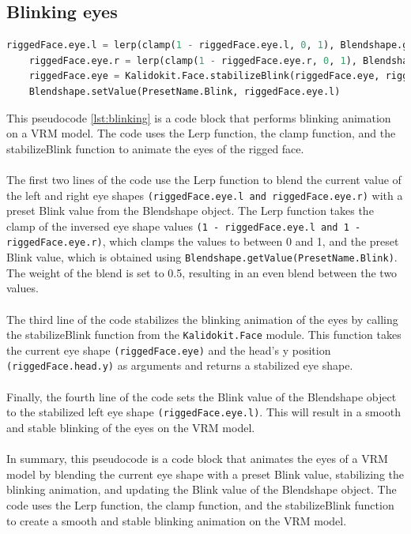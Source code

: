 \subsection{Blinking eyes}
\begin{lstlisting}[language=Python,caption=Blinking of the eyes,label=lst:blinking]
    riggedFace.eye.l = lerp(clamp(1 - riggedFace.eye.l, 0, 1), Blendshape.getValue(PresetName.Blink), 0.5)
    riggedFace.eye.r = lerp(clamp(1 - riggedFace.eye.r, 0, 1), Blendshape.getValue(PresetName.Blink), 0.5)
    riggedFace.eye = Kalidokit.Face.stabilizeBlink(riggedFace.eye, riggedFace.head.y)
    Blendshape.setValue(PresetName.Blink, riggedFace.eye.l)

\end{lstlisting}
This pseudocode \ref{lst:blinking} is a code block that performs blinking animation on a VRM model. 
The code uses the Lerp function, the clamp function, and the stabilizeBlink function 
to animate the eyes of the rigged face.
\\
\\
The first two lines of the code use the Lerp function to blend the current value of the left and right eye shapes 
\texttt{(riggedFace.eye.l and riggedFace.eye.r)} with a preset Blink value from the Blendshape object. The Lerp 
function takes the clamp of the inversed eye shape values \texttt{(1 - riggedFace.eye.l and 1 - riggedFace.eye.r)}, 
which clamps the values to between 0 and 1, and the preset Blink value, which is obtained using \texttt{Blendshape.getValue(PresetName.Blink)}. 
The weight of the blend is set to 0.5, resulting in an even blend between the two values.
\\
\\
The third line of the code stabilizes the blinking animation of the eyes by calling 
the stabilizeBlink function from the \texttt{Kalidokit.Face} module. This function takes the 
current eye shape \texttt{(riggedFace.eye)} and the head's y position \texttt{(riggedFace.head.y)}  as arguments 
and returns a stabilized eye shape.
\\
\\
Finally, the fourth line of the code sets the Blink value of the Blendshape object to the 
stabilized left eye shape \texttt{(riggedFace.eye.l)}. This will result in a smooth and stable blinking  
of the eyes on the VRM model.
\\
\\
In summary, this pseudocode is a code block that animates the eyes of a VRM model by 
blending the current eye shape with a preset Blink value, stabilizing the blinking animation, 
and updating the Blink value of the Blendshape object. The code uses the Lerp function, the clamp 
function, and the stabilizeBlink function to create a smooth and stable blinking animation on the VRM model.
\\
\\
